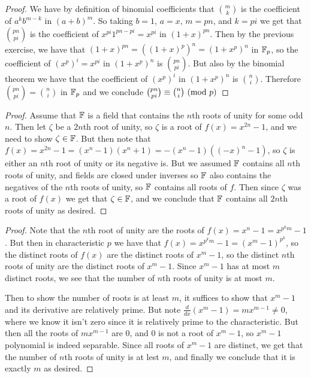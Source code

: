 \documentclass[11pt]{article}
\begin{document}
\begin{proof}
  We have by definition of binomial coefficients that $\binom{m}{k}$ is the coefficient of $a^k b^{m-k}$ in $(a + b)^m$.
  So taking $b = 1$, $a = x$, $m = pn$, and $k = pi$ we get that $\binom{pn}{pi}$ is the coefficient of $x^{pi} 1^{pn - pi} = x^{pi}$ in $(1 + x)^{pn}$. 
  Then by the previous exercise, we have that $(1 + x)^{pn} = ((1 + x)^p)^n = (1 + x^p)^n$ in $\mathbb{F}_p$, so the coefficient of $(x^p)^i = x^{pi}$ in $(1 + x^p)^n$ is $\binom{pn}{pi}$. 
  But also by the binomial theorem we have that the coefficient of $(x^p)^i$ in $(1 + x^p)^n$ is $\binom{n}{i}$.
  Therefore $\binom{pn}{pi} = \binom{n}{i}$ in $\mathbb{F}_p$ and we conclude $\binom{pn}{pi} \equiv \binom{n}{i}\ (\text{mod}\ p)$
\end{proof}


\begin{proof}
  Assume that $\mathbb{F}$ is a field that contains the $n$th roots of unity for some odd $n$.
  Then let $\zeta$ be a $2n$th root of unity, so $\zeta$ is a root of $f(x) = x^{2n} - 1$, and we need to show $\zeta \in \mathbb{F}$.
  But then note that $f(x) = x^{2n} - 1 = (x^n - 1)(x^n + 1) = -(x^n - 1)((-x)^n - 1)$, so $\zeta$ is either an $n$th root of unity or its negative is.
  But we assumed $\mathbb{F}$ contains all $n$th roots of unity, and fields are closed under inverses so $\mathbb{F}$ also contains the negatives of the $n$th roots of unity, so $\mathbb{F}$ contains all roots of $f$.
  Then since $\zeta$ was a root of $f(x)$ we get that $\zeta \in \mathbb{F}$, and we conclude that $\mathbb{F}$ contains all $2n$th roots of unity as desired.
\end{proof}


\begin{proof}
  Note that the $n$th root of unity are the roots of $f(x) = x^n - 1 = x^{p^km} - 1$.
  But then in characteristic $p$ we have that $f(x) = x^{p^km} - 1 = (x^m - 1)^{p^k}$, so the distinct roots of $f(x)$ are the distinct roots of $x^m - 1$, so the distinct $n$th roots of unity are the distinct roots of $x^m - 1$.
  Since $x^m - 1$ has at most $m$ distinct roots, we see that the number of $n$th roots of unity is at most $m$.

  Then to show the number of roots is at least $m$, it suffices to show that $x^m - 1$ and its derivative are relatively prime.
  But note $\frac{d}{dx}(x^m - 1) = mx^{m-1} \ne 0$, where we know it isn't zero since it is relatively prime to the characteristic.
  But then all the roots of $mx^{m-1}$ are $0$, and $0$ is not a root of $x^m - 1$, so $x^m - 1$ polynomial is indeed separable.
  Since all roots of $x^m - 1$ are distinct, we get that the number of $n$th roots of unity is at lest $m$, and finally we conclude that it is exactly $m$ as desired.
\end{proof}
\end{document}
